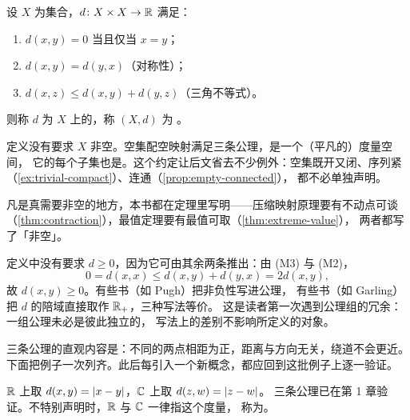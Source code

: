 \begin{definition}[度量空间]
  \label{def:metric-space}
  设 \(X\) 为集合，\(d \colon X \times X \to \mathbb{R}\) 满足：
  \begin{enumerate}[label=(M\arabic*)]
    \item \(d(x,y) = 0\) 当且仅当 \(x = y\)；
    \item \(d(x,y) = d(y,x)\)（对称性）；
    \item \(d(x,z) \le d(x,y) + d(y,z)\)（三角不等式）。
  \end{enumerate}
  则称 \(d\) 为 \(X\) 上的，称 \((X,d)\) 为%
  。
\end{definition}

\begin{remark}
  定义没有要求 \(X\) 非空。空集配空映射满足三条公理，是一个（平凡的）度量空间，
  它的每个子集也是。这个约定让后文省去不少例外：空集既开又闭、序列紧
  （\cref{ex:trivial-compact}）、连通（\cref{prop:empty-connected}），
  都不必单独声明。

  凡是真需要非空的地方，本书都在定理里写明——压缩映射原理要有不动点可谈
  （\cref{thm:contraction}），最值定理要有最值可取（\cref{thm:extreme-value}），
  两者都写了「非空」。
\end{remark}

\begin{remark}
  定义中没有要求 \(d \ge 0\)，因为它可由其余两条推出：由 (M3) 与 (M2)，
  \begin{equation}
    \label{eq:nonneg}
    0 = d(x,x) \le d(x,y) + d(y,x) = 2d(x,y),
  \end{equation}
  故 \(d(x,y) \ge 0\)。有些书（如 Pugh）把非负性写进公理，
  有些书（如 Garling）把 \(d\) 的陪域直接取作 \(\mathbb{R}_{+}\)，三种写法等价。
  这是读者第一次遇到公理组的冗余：一组公理未必是彼此独立的，
  写法上的差别不影响所定义的对象。
\end{remark}

三条公理的直观内容是：不同的两点相距为正，距离与方向无关，绕道不会更近。
下面把例子一次列齐。此后每引入一个新概念，都应回到这批例子上逐一验证。

\begin{example}[实直线与复平面]
  \label{ex:metric-R}
  \(\mathbb{R}\) 上取 \(d(x,y) = \lvert x-y\rvert\)，\(\mathbb{C}\) 上取 \(d(z,w) = \lvert z-w\rvert\)。
  三条公理已在第 1 章验证。不特别声明时，\(\mathbb{R}\) 与 \(\mathbb{C}\) 一律指这个度量，
  称为。
\end{example}

